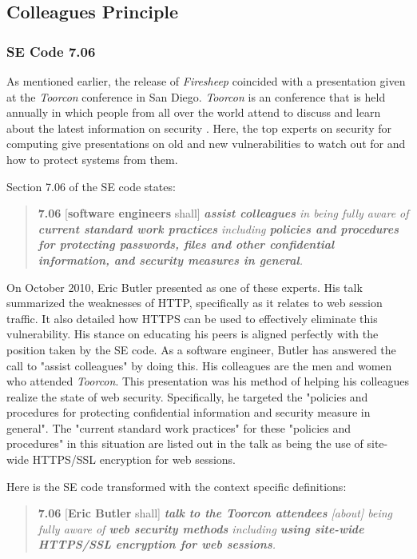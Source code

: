 \documentclass[11pt]{article}
\begin{document}
\begin{multicols}{2}
\subsection{Colleagues Principle}
\subsubsection{SE Code 7.06}
As mentioned earlier, the release of \emph{Firesheep} coincided with a presentation given at the \emph{Toorcon} conference in San Diego. \emph{Toorcon} is an conference that is held annually in which people from all over the world attend to discuss and learn about the latest information on security \cite{toorcon}. Here, the top experts on security for computing give presentations on old and new vulnerabilities to watch out for and how to protect systems from them.

Section 7.06 of the SE code states:

\begin{quote}
  \textbf{7.06} [\textbf{software engineers} shall] \emph{\textbf{assist colleagues} in being fully aware of \textbf{current standard work practices} including \textbf{policies and procedures for protecting passwords, files and other confidential information, and security measures in general}.} \cite{se_code}
\end{quote}

On October 2010, Eric Butler presented as one of these experts. His talk summarized the weaknesses of HTTP, specifically as it relates to web session traffic. It also detailed how HTTPS can be used to effectively eliminate this vulnerability. His stance on educating his peers is aligned perfectly with the position taken by the SE code. As a software engineer, Butler has answered the call to "assist colleagues" by doing this. His colleagues are the men and women who attended \emph{Toorcon}. This presentation was his method of helping his colleagues realize the state of web security. Specifically, he targeted the "policies and procedures for protecting confidential information and security measure in general". The "current standard work practices" for these "policies and procedures" in this situation are listed out in the talk as being the use of site-wide HTTPS/SSL encryption for web sessions.

Here is the SE code transformed with the context specific definitions:

\begin{quote}
  \textbf{7.06} [\textbf{Eric Butler} shall] \emph{\textbf{talk to the Toorcon attendees} [about] being fully aware of \textbf{web security methods} including \textbf{using site-wide HTTPS/SSL encryption for web sessions}.}
\end{quote}


\end{multicols}
\end{document}
